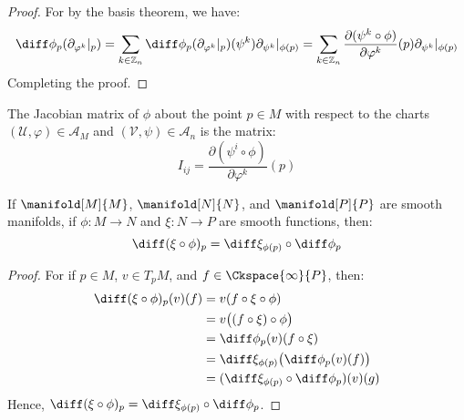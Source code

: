         \begin{proof}
            For by the basis theorem, we have:
            \begin{equation}
                \diff\phi_{p}(\partial_{\varphi^{k}}|_{p})=
                \sum_{k\in\mathbb{Z}_{n}}
                \diff\phi_{p}(\partial_{\varphi^{k}}|_{p})(\psi^{k})
                \partial_{\psi^{k}}|_{\phi(p)}
                =\sum_{k\in\mathbb{Z}_{n}}
                \frac{\partial(\psi^{k}\circ\phi)}{\partial\varphi^{k}}(p)
                \partial_{\psi^{k}}|_{\phi(p)}
            \end{equation}
            Completing the proof.
        \end{proof}
        The Jacobian matrix of $\phi$ about the point $p\in{M}$ with respect
        to the charts $(\mathcal{U},\varphi)\in\mathcal{A}_{M}$ and
        $(\mathcal{V},\psi)\in\mathcal{A}_{n}$ is the matrix:
        \begin{equation}
            I_{ij}=
            \frac{\partial(\psi^{i}\circ\phi)}{\partial\varphi^{k}}(p)
        \end{equation}
        \begin{theorem}
            If $\manifold[M]{M}$, $\manifold[N]{N}$, and $\manifold[P]{P}$
            are smooth manifolds, if $\phi:M\rightarrow{N}$ and
            $\xi:N\rightarrow{P}$ are smooth functions, then:
            \begin{equation}
                \diff(\xi\circ\phi)_{p}=
                \diff\xi_{\phi(p)}\circ\diff\phi_{p}
            \end{equation}
        \end{theorem}
        \begin{proof}
            For if $p\in{M}$, $v\in{T}_{p}M$, and $f\in\Ckspace{\infty}{P}$,
            then:
            \begin{align}
                \diff(\xi\circ\phi)_{p}(v)(f)
                &=v(f\circ\xi\circ\phi)\\
                &=v\big((f\circ\xi)\circ\phi\big)\\
                &=\diff\phi_{p}(v)(f\circ\xi)\\
                &=\diff\xi_{\phi(p)}\big(\diff\phi_{p}(v)(f)\big)\\
                &=(\diff\xi_{\phi(p)}\circ\diff\phi_{p})(v)(g)
            \end{align}
            Hence,
            $\diff(\xi\circ\phi)_{p}=\diff\xi_{\phi(p)}\circ\diff\phi_{p}$.
        \end{proof}
